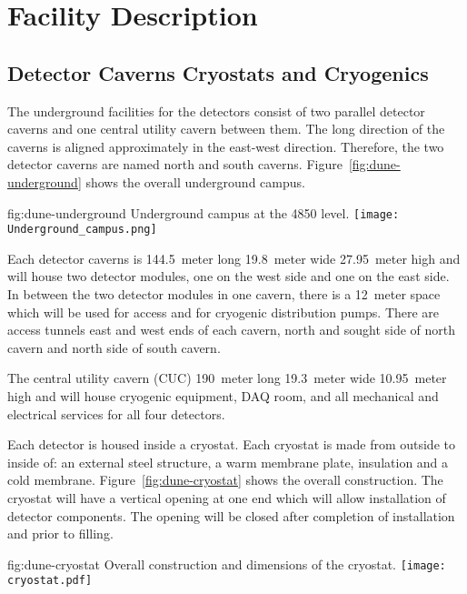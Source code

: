 \chapter{Facility Description}
\label{vl:tc-facility}

\section{Detector Caverns Cryostats and Cryogenics}
\label{sec:fdsp-coord-faci-caverns}

The underground facilities for the detectors consist of two parallel
detector caverns and one central utility cavern between them. The long
direction of the caverns is aligned approximately in the east-west
direction. Therefore, the two detector caverns are named north and
south caverns. Figure~\ref{fig:dune-underground} shows the overall
underground campus.
\begin{dunefigure}{fig:dune-underground}
  {Underground campus at the 4850 level.}
  \texttt{[image: Underground\_campus.png]}
\end{dunefigure}

Each detector caverns is \SI{144.5}{meter} long \SI{19.8}{meter} wide
\SI{27.95}{meter} high and will house two detector modules, one on the
west side and one on the east side. In between the two detector
modules in one cavern, there is a \SI{12}{meter} space which will be
used for access and for cryogenic distribution pumps. There are access
tunnels east and west ends of each cavern, north and sought side of
north cavern and north side of south cavern.

The central utility cavern (CUC) \SI{190}{meter} long \SI{19.3}{meter}
wide \SI{10.95}{meter} high and will house cryogenic equipment, DAQ
room, and all mechanical and electrical services for all four
detectors.

Each detector is housed inside a cryostat. Each cryostat is made from
outside to inside of: an external steel structure, a warm membrane
plate, insulation and a cold membrane. Figure~\ref{fig:dune-cryostat}
shows the overall construction. The cryostat will have a vertical
opening at one end which will allow installation of detector
components. The opening will be closed after completion of
installation and prior to filling.
\begin{dunefigure}{fig:dune-cryostat}
  {Overall construction and dimensions of the  cryostat.}
  \texttt{[image: cryostat.pdf]}
\end{dunefigure}

